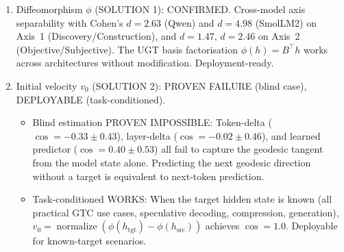 \documentclass[11pt]{article}
\begin{document}
\begin{enumerate}
\item Diffeomorphism $\phi$ (SOLUTION 1): CONFIRMED.
      Cross-model axis separability with Cohen's $d{=}2.63$ (Qwen) and
      $d{=}4.98$ (SmolLM2) on Axis~1 (Discovery/Construction), and
      $d{=}1.47$, $d{=}2.46$ on Axis~2 (Objective/Subjective). The UGT
      basis factorisation $\phi(h){=}B^\top h$ works across architectures
      without modification. Deployment-ready.

\item Initial velocity $v_0$ (SOLUTION 2): PROVEN FAILURE
      (blind case), DEPLOYABLE (task-conditioned).
      \begin{itemize}
      \item Blind estimation PROVEN IMPOSSIBLE: Token-delta
            ($\cos{=}{-}0.33{\pm}0.43$), layer-delta ($\cos{=}{-}0.02{\pm}0.46$),
            and learned predictor ($\cos{=}0.40{\pm}0.53$) all fail to
            capture the geodesic tangent from the model state alone.
            Predicting the next geodesic direction without a target is
            equivalent to next-token prediction.
      \item Task-conditioned WORKS: When the target hidden state
            is known (all practical GTC use cases, speculative decoding,
            compression, generation), $v_0{=}\operatorname{normalize}(\phi(h_{\text{tgt}}){-}\phi(h_{\text{src}}))$
            achieves $\cos{=}1.0$. Deployable for known-target scenarios.
      \end{itemize}


\end{enumerate}
\end{document}
